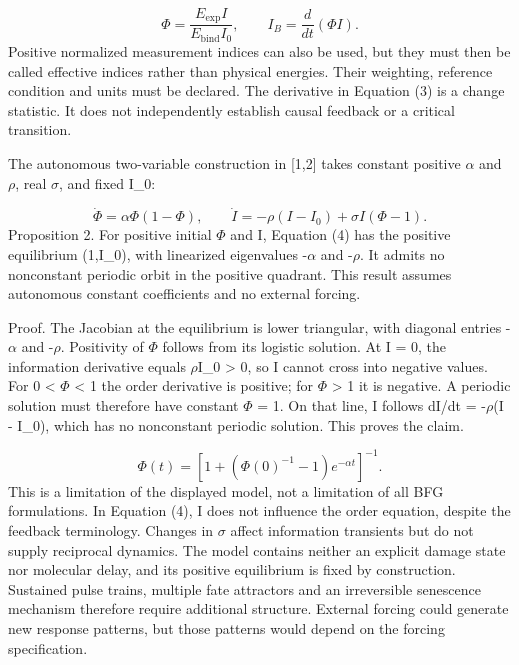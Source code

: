 \documentclass[11pt,a4paper]{article}
\begin{document}
\begin{equation}\Phi=\frac{E_{\mathrm{exp}}I}{E_{\mathrm{bind}}I_0},\qquad I_B=\frac{d}{dt}(\Phi I).\tag{3}\end{equation}
Positive normalized measurement indices can also be used, but they must then be called effective indices rather than physical energies. Their weighting, reference condition and units must be declared. The derivative in Equation (3) is a change statistic. It does not independently establish causal feedback or a critical transition.

The autonomous two-variable construction in [1,2] takes constant positive $\alpha$ and $\rho$, real $\sigma$, and fixed I\_0:

\begin{equation}\dot\Phi=\alpha\Phi(1-\Phi),\qquad \dot I=-\rho(I-I_0)+\sigma I(\Phi-1).\tag{4}\end{equation}
Proposition 2. For positive initial $\Phi$ and I, Equation (4) has the positive equilibrium (1,I\_0), with linearized eigenvalues -$\alpha$ and -$\rho$. It admits no nonconstant periodic orbit in the positive quadrant. This result assumes autonomous constant coefficients and no external forcing.

Proof. The Jacobian at the equilibrium is lower triangular, with diagonal entries -$\alpha$ and -$\rho$. Positivity of $\Phi$ follows from its logistic solution. At I = 0, the information derivative equals $\rho$I\_0 > 0, so I cannot cross into negative values. For 0 < $\Phi$ < 1 the order derivative is positive; for $\Phi$ > 1 it is negative. A periodic solution must therefore have constant $\Phi$ = 1. On that line, I follows dI/dt = -$\rho$(I - I\_0), which has no nonconstant periodic solution. This proves the claim.

\begin{equation}\Phi(t)=\left[1+\left(\Phi(0)^{-1}-1\right)e^{-\alpha t}\right]^{-1}.\tag{5}\end{equation}
This is a limitation of the displayed model, not a limitation of all BFG formulations. In Equation (4), I does not influence the order equation, despite the feedback terminology. Changes in $\sigma$ affect information transients but do not supply reciprocal dynamics. The model contains neither an explicit damage state nor molecular delay, and its positive equilibrium is fixed by construction. Sustained pulse trains, multiple fate attractors and an irreversible senescence mechanism therefore require additional structure. External forcing could generate new response patterns, but those patterns would depend on the forcing specification.
\end{document}
